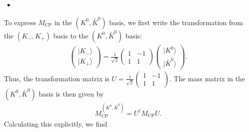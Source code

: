\begin{itemize}
    \item [(b)]
\end{itemize}
To express $M_{\text{CP}}$ in the $(K^0, \bar{K}^0)$ basis, we first write the transformation from the $(K_-, K_+)$ basis to the $(K^0, \bar{K}^0)$ basis:
\begin{align}
    \begin{pmatrix}
        |K_-\rangle \\
        |K_+\rangle
    \end{pmatrix} = \frac{1}{\sqrt{2}}\begin{pmatrix}
    1 & -1 \\
    1 & 1
    \end{pmatrix} \begin{pmatrix}
    |K^0\rangle \\
    |\bar{K}^0\rangle
    \end{pmatrix}.
\end{align}
Thus, the transformation matrix is $U = \frac{1}{\sqrt{2}}\begin{pmatrix}
    1 & -1 \\
    1 & 1
\end{pmatrix}$. The mass matrix in the $(K^0, \bar{K}^0)$ basis is then given by
\begin{align}
    M_{\text{CP}}^{(K^0, \bar{K}^0)} = U^\dagger M_{\text{CP}} U.
\end{align}
Calculating this explicitly, we find
